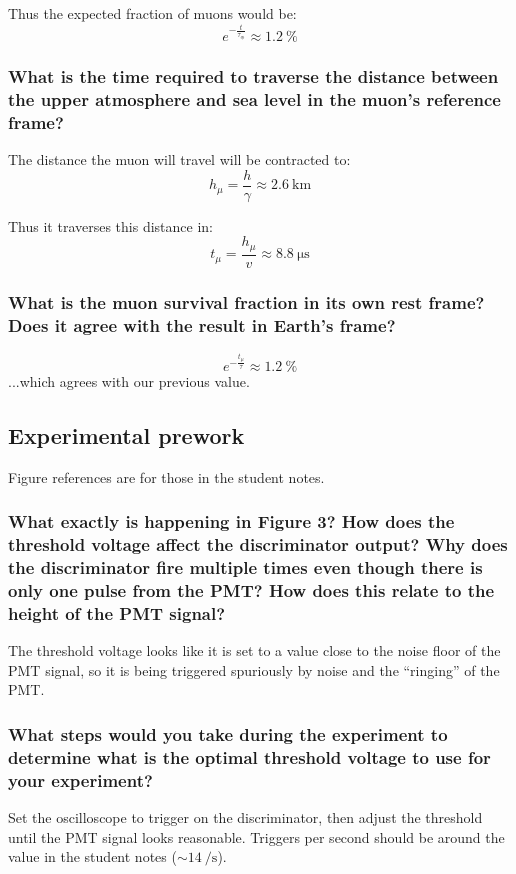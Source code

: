 \documentclass[a4paper]{scrartcl}
\begin{document}
Thus the expected fraction of muons would be:
\[e^{-\frac{t}{\tau_\oplus}} \approx \SI{1.2}{\percent}\]

\subsubsection{What is the time required to traverse the distance between the upper atmosphere and sea level in the muon's reference frame?}
The distance the muon will travel will be contracted to:
\[h_\mu = \frac{h}{\gamma} \approx \SI{2.6}{\kilo\metre}\]

Thus it traverses this distance in:
\[t_\mu = \frac{h_\mu}{v} \approx \SI{8.8}{\micro\second}\]

\subsubsection{What is the muon survival fraction in its own rest frame? Does it agree with the result in Earth's frame?}
\[e^{-\frac{t_\mu}{\tau}} \approx \SI{1.2}{\percent}\]
...which agrees with our previous value.

\subsection{Experimental prework}
Figure references are for those in the student notes.

\subsubsection{What exactly is happening in Figure 3? How does the threshold voltage affect the discriminator output? Why does the discriminator fire multiple times even though there is only one pulse from the PMT? How does this relate to the height of the PMT signal?}
The threshold voltage looks like it is set to a value close to the noise floor of the PMT signal, so it is being triggered spuriously by noise and the ``ringing'' of the PMT.

\subsubsection{What steps would you take during the experiment to determine what is the optimal threshold voltage to use for your experiment?}
Set the oscilloscope to trigger on the discriminator, then adjust the threshold until the PMT signal looks reasonable. Triggers per second should be around the value in the student notes (\(\sim\SI{14}{\per\second}\)).
\end{document}
